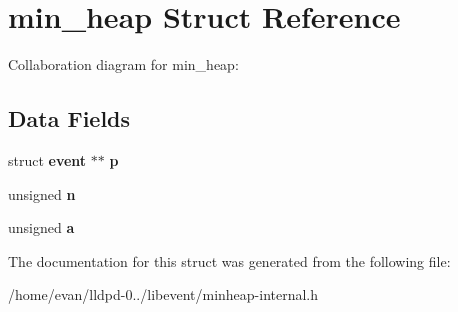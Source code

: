 \section{min\-\_\-heap \-Struct \-Reference}
\label{structmin__heap}


\-Collaboration diagram for min\-\_\-heap\-:
\subsection*{\-Data \-Fields}
\begin{DoxyCompactItemize}
\item 
struct {\bf event} $\ast$$\ast$ {\bfseries p}\label{structmin__heap_a73cb130e5db54d45edb526dc173e309a}

\item 
unsigned {\bfseries n}\label{structmin__heap_a079528bb7fc5a12e84dee1bbbe451563}

\item 
unsigned {\bfseries a}\label{structmin__heap_a43b6d2cb6d9260a7ffdd0b094aa9fcfc}

\end{DoxyCompactItemize}


\-The documentation for this struct was generated from the following file\-:\begin{DoxyCompactItemize}
\item 
/home/evan/lldpd-\/0../libevent/minheap-\/internal.\-h\end{DoxyCompactItemize}
